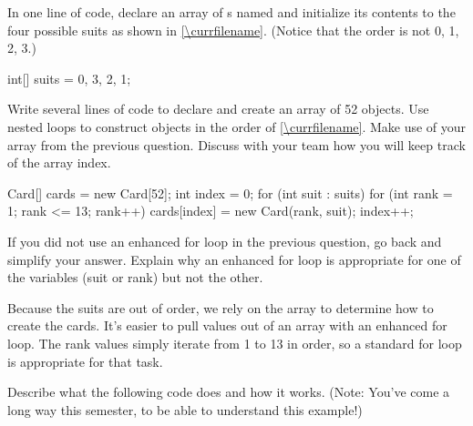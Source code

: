 \begin{javalst}
}
\end{javalst}


\Q In one line of code, declare an array of s named  and initialize its contents to the four possible suits as shown in \ref{\currfilename}.
(Notice that the order is not 0, 1, 2, 3.)


\vspace*{-1ex}
\begin{answer}[3em]
\begin{javaans}
    int[] suits = {0, 3, 2, 1};
\end{javaans}
\end{answer}


\Q \label{build}
Write several lines of code to declare and create an array of 52  objects.
Use nested  loops to construct  objects in the order of \ref{\currfilename}.
Make use of your  array from the previous question.
Discuss with your team how you will keep track of the array index.

\vspace*{-1ex}
\begin{answer}[11em]
\begin{javaans}
Card[] cards = new Card[52];
int index = 0;
for (int suit : suits) {
    for (int rank = 1; rank <= 13; rank++) {
        cards[index] = new Card(rank, suit);
        index++;
    }
}
\end{javaans}
\end{answer}


\Q If you did not use an enhanced for loop in the previous question, go back and simplify your answer.
Explain why an enhanced for loop is appropriate for one of the variables (suit or rank) but not the other.

\begin{answer}[5em]
Because the suits are out of order, we rely on the  array to determine how to create the cards.
It's easier to pull values out of an array with an enhanced for loop.
The rank values simply iterate from 1 to 13 in order, so a standard for loop is appropriate for that task.
\end{answer}


\Q Describe what the following code does and how it works. (Note: You've come a long way this semester, to be able to understand this example!)


